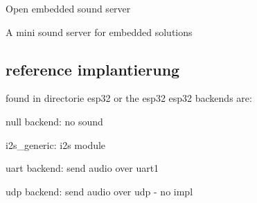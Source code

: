 Open embedded sound server

A mini sound server for embedded solutions

\subsection*{reference implantierung}

found in directorie {\ttfamily esp32} or the esp32 esp32 backends are\+:
\begin{DoxyItemize}
\item null backend\+: no sound
\item i2s\+\_\+generic\+: i2s module
\item uart backend\+: send audio over uart1
\item udp backend\+: send audio over udp -\/ no impl 
\end{DoxyItemize}